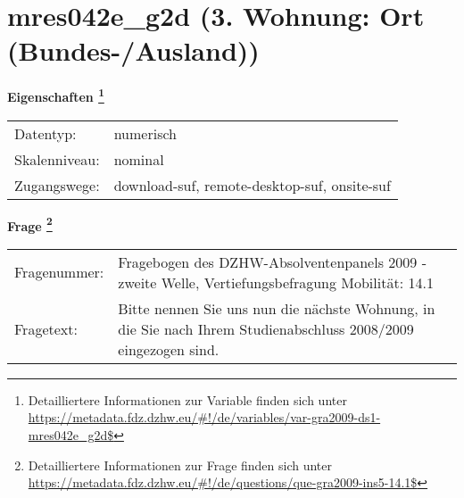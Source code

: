 
    \setcounter{footnote}{0}

    \vspace*{-1.8cm}
	\section{mres042e\_g2d (3. Wohnung: Ort (Bundes-/Ausland))}
	\label{section:mres042e_g2d}



    \vspace*{0.5cm}
    \noindent\textbf{Eigenschaften
	\footnote{Detailliertere Informationen zur Variable finden sich unter
		\url{https://metadata.fdz.dzhw.eu/\#!/de/variables/var-gra2009-ds1-mres042e_g2d$}}}\\
	\begin{tabularx}{\hsize}{@{}lX}
	Datentyp: & numerisch \\
	Skalenniveau: & nominal \\
	Zugangswege: &
	  download-suf, 
	  remote-desktop-suf, 
	  onsite-suf
 \\
    \end{tabularx}



				\vspace*{0.5cm}
                \noindent\textbf{Frage
	                \footnote{Detailliertere Informationen zur Frage finden sich unter
		              \url{https://metadata.fdz.dzhw.eu/\#!/de/questions/que-gra2009-ins5-14.1$}}}\\
				\begin{tabularx}{\hsize}{@{}lX}
					Fragenummer: &
					  Fragebogen des DZHW-Absolventenpanels 2009 - zweite Welle, Vertiefungsbefragung Mobilität:
					  14.1
 \\
					Fragetext: & Bitte nennen Sie uns nun die nächste Wohnung, in die Sie nach Ihrem Studienabschluss 2008/2009 eingezogen sind. \\
				\end{tabularx}





